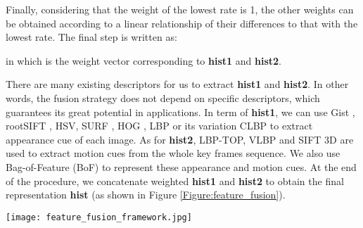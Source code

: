 \documentclass[5p]{elsarticle}
\begin{document}
Finally, considering that the weight of the lowest rate is 1, the other weights can be obtained according to a linear relationship of their differences to that with the lowest rate.
The final step is written as:

in which  is the weight vector corresponding to \textbf{hist1} and \textbf{hist2}.

There are many existing descriptors for us to extract \textbf{hist1} and \textbf{hist2}.
In other words, the fusion strategy does not depend on specific descriptors, which guarantees its great potential in applications.
In term of \textbf{hist1}, we can use Gist \cite{oliva2001modeling}, rootSIFT \cite{arandjelovic2012three}, HSV, SURF \cite{bay2006surf}, HOG \cite{dalal2005histograms}, LBP \cite{ojala2002multiresolution} or its variation CLBP \cite{guo2010completed} to extract appearance cue of each image.
As for \textbf{hist2}, LBP-TOP, VLBP \cite{zhao2007dynamic} and SIFT 3D \cite{scovanner20073} are used to extract motion cues from the whole key frames sequence.
We also use Bag-of-Feature (BoF) \cite{liu2016sequential,dardas2011real} to represent these appearance and motion cues.
At the end of the procedure, we concatenate weighted \textbf{hist1} and \textbf{hist2} to obtain the final representation \textbf{hist} (as shown in Figure \ref{Figure:feature_fusion}).

\begin{figure*}[!tbp]
	\begin{centering}
		\texttt{[image: feature\_fusion\_framework.jpg]}
		\caption{The framework of the proposed feature extraction and fusion methods.}
		\label{Figure:feature_fusion}
	\end{centering}
\end{figure*}
\end{document}
